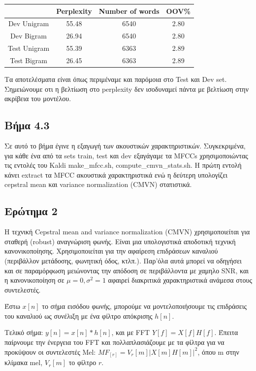 \documentclass[12pt]{article}
\begin{document}
\begin{center}
\begin{tabular}{ |c|c|c|c| } 
 \hline
    &Perplexity & Number of words & OOV\% \\
 \hline 
 Dev Unigram & 55.48 & 6540 & 2.80\\
\hline 
 Dev Bigram & 26.94 & 6540 & 2.80\\
\hline 
 Test Unigram & 55.39 & 6363 & 2.89\\
\hline 
 Test Bigram & 26.45 & 6363 & 2.89\\
\hline 
\end{tabular}
\end{center}

Τα αποτελέσματα είναι όπως περιμέναμε και παρόμοια στο Test και Dev set. 
Σημειώνουμε οτι η βελτίωση στο perplexity δεν ισοδυναμεί πάντα με βελτίωση στην ακρίβεια του μοντέλου. 



\subsection*{Βήμα 4.3}
Σε αυτό το βήμα έγινε η εξαγωγή των ακουστικών χαρακτηριστικών. Συγκεκριμένα, για κάθε ένα από τα sets train, test και dev εξαγάγαμε τα MFCCs  χρησιμοποιώντας τις εντολές του Kaldi make\_mfcc.sh, compute\_cmvn\_stats.sh. Η πρώτη εντολή κάνει extract τα MFCC ακουστικά χαρακτηριστικά ενώ η δεύτερη υπολογίζει cepstral mean και variance normalization (CMVN) στατιστικά. 


\subsection*{Ερώτημα 2}

Η τεχνική Cepstral mean and variance normalization (CMVN) χρησιμοποιείται για σταθερή (robust) αναγνώριση φωνής. Είναι μια υπολογιστικά αποδοτική τεχνική κανονικοποίησης. Χρησιμοποιείται για την αφαίρεση επιδράσεων καναλιού (περιβάλλον μετάδοσης, φωνητική όδος, κτλπ.). Παρ'όλα αυτά μπορεί να οδηγήσει και σε παραμόρφωση μειώνοντας την απόδοση σε περιβάλλοντα με χαμηλο SNR, και η κανονικοποίηση σε $μ=0, σ^2 =1$ αφαιρεί διακριτικά χαρακτηριστικά ανάμεσα στους συντελεστές. 

Έστω $x[n]$ το σήμα εισόδου φωνής, μπορούμε να μοντελοποιήσουμε τις επιδράσεις του καναλιού ως συνέλιξη με ένα φίλτρο απόκρισης $h[n]$. 

Τελικό σήμα: $y[n] = x[n] * h[n]$, και με FFT $Y[f] = X[f] H[f]$. Έπειτα παίρνουμε την ένεργεια του FFT και πολλαπλασιάζουμε με τα φίλτρα για να προκύψουν οι συντελεστές Mel:
$MF_[r] =  V_r[m]|X[m] H[m]|^2 $, όπου m στην κλίμακα mel, $V_r[m]$ το φίλτρο $r$. 
\end{document}
